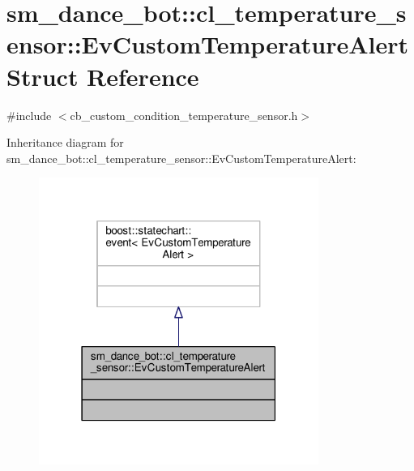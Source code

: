 \hypertarget{structsm__dance__bot_1_1cl__temperature__sensor_1_1EvCustomTemperatureAlert}{}\section{sm\+\_\+dance\+\_\+bot\+:\+:cl\+\_\+temperature\+\_\+sensor\+:\+:Ev\+Custom\+Temperature\+Alert Struct Reference}
\label{structsm__dance__bot_1_1cl__temperature__sensor_1_1EvCustomTemperatureAlert}


{\ttfamily \#include $<$cb\+\_\+custom\+\_\+condition\+\_\+temperature\+\_\+sensor.\+h$>$}



Inheritance diagram for sm\+\_\+dance\+\_\+bot\+:\+:cl\+\_\+temperature\+\_\+sensor\+:\+:Ev\+Custom\+Temperature\+Alert\+:\nopagebreak
\begin{figure}[H]
\begin{center}
\leavevmode
\includegraphics[width=259pt]{structsm__dance__bot_1_1cl__temperature__sensor_1_1EvCustomTemperatureAlert__inherit__graph}
\end{center}
\end{figure}


